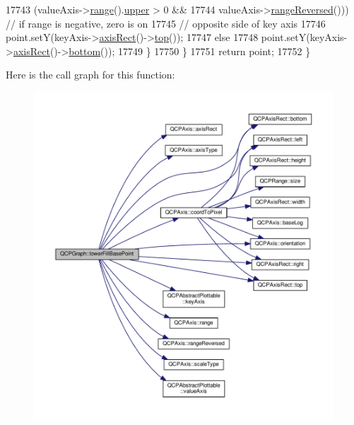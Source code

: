 \begin{DoxyCode}
17743           (valueAxis->\hyperlink{class_q_c_p_axis_ab1ea79a4f5ea4cf42620f8f51c477ac4}{range}().\hyperlink{class_q_c_p_range_ae44eb3aafe1d0e2ed34b499b6d2e074f}{upper} > 0 &&
17744            valueAxis->\hyperlink{class_q_c_p_axis_ade26dc7994ccd8a11f64fd83377ee021}{rangeReversed}())) \textcolor{comment}{// if range is negative, zero is on}
17745                                         \textcolor{comment}{// opposite side of key axis}
17746         point.setY(keyAxis->\hyperlink{class_q_c_p_axis_aada3102af43b029e3879bcbf2bddfabb}{axisRect}()->\hyperlink{class_q_c_p_axis_rect_ac45aef1eb75cea46b241b6303028a607}{top}());
17747       \textcolor{keywordflow}{else}
17748         point.setY(keyAxis->\hyperlink{class_q_c_p_axis_aada3102af43b029e3879bcbf2bddfabb}{axisRect}()->\hyperlink{class_q_c_p_axis_rect_af2b5982ebe7e6f781b9bf1cc371a60d8}{bottom}());
17749     \}
17750   \}
17751   \textcolor{keywordflow}{return} point;
17752 \}
\end{DoxyCode}


Here is the call graph for this function\+:\nopagebreak
\begin{figure}[H]
\begin{center}
\leavevmode
\includegraphics[width=350pt]{class_q_c_p_graph_a41f982e8ceaefe6a53eb7432f26d64b6_cgraph}
\end{center}
\end{figure}




